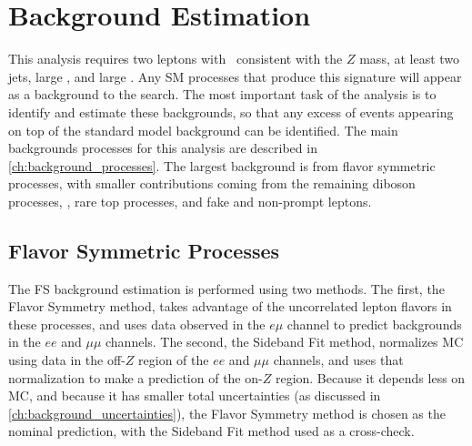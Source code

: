 
\chapter{Background Estimation} %
\label{ch:backgrounds} 

This analysis requires two leptons with \mll~consistent with the $Z$ mass, at least two jets, large \met, and large \HT. Any \ac{SM} processes that produce this signature will appear as a background to the search. The most important task of the analysis is to identify and estimate these backgrounds, so that any excess of events appearing on top of the standard model background can be identified. The main backgrounds processes for this analysis are described in \autoref{ch:background_processes}. The largest background is from flavor symmetric processes, with smaller contributions coming from the remaining diboson processes, \dyjets, rare top processes, and fake and non-prompt leptons.


\section{Flavor Symmetric Processes}
\label{sec:bg-fs}

The \ac{FS} background estimation is performed using two methods. The first, the Flavor Symmetry method, takes advantage of the uncorrelated lepton flavors in these processes, and uses data observed in the $e\mu$ channel to predict backgrounds in the $ee$ and $\mu\mu$ channels. The second, the Sideband Fit method, normalizes \ac{MC} using data in the off-$Z$ region of the $ee$ and $\mu\mu$ channels, and uses that normalization to make a prediction of the on-$Z$ region. Because it depends less on \ac{MC}, and because it has smaller total uncertainties (as discussed in \autoref{ch:background_uncertainties}), the Flavor Symmetry method is chosen as the nominal prediction, with the Sideband Fit method used as a cross-check.


